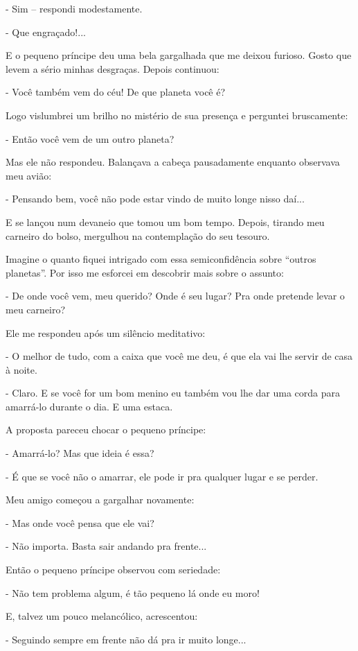 \begin{Parallel}[p]{}{}
{- Sim -- respondi modestamente.

- Que engraçado!...

E o pequeno príncipe deu uma bela gargalhada que me deixou furioso.
Gosto que levem a sério minhas desgraças. Depois continuou:

- Você também vem do céu! De que planeta você é?

Logo vislumbrei um brilho no mistério de sua presença e perguntei
bruscamente:

- Então você vem de um outro planeta?

Mas ele não respondeu. Balançava a cabeça pausadamente enquanto
observava meu avião:

- Pensando bem, você não pode estar vindo de muito longe nisso daí...

E se lançou num devaneio que tomou um bom tempo. Depois, tirando meu
carneiro do bolso, mergulhou na contemplação do seu tesouro.

Imagine o quanto fiquei intrigado com essa semiconfidência sobre
``outros planetas''. Por isso me esforcei em descobrir mais sobre o
assunto:

- De onde você vem, meu querido? Onde é seu lugar? Pra onde pretende
levar o meu carneiro?

Ele me respondeu após um silêncio meditativo:

- O melhor de tudo, com a caixa que você me deu, é que ela vai lhe
servir de casa à noite.

- Claro. E se você for um bom menino eu também vou lhe dar uma corda
para amarrá-lo durante o dia. E uma estaca.

A proposta pareceu chocar o pequeno príncipe:

- Amarrá-lo? Mas que ideia é essa?

- É que se você não o amarrar, ele pode ir pra qualquer lugar e se
perder.

Meu amigo começou a gargalhar novamente:

- Mas onde você pensa que ele vai?

- Não importa. Basta sair andando pra frente...

Então o pequeno príncipe observou com seriedade:

- Não tem problema algum, é tão pequeno lá onde eu moro!

E, talvez um pouco melancólico, acrescentou:

- Seguindo sempre em frente não dá pra ir muito longe...\\

}
\end{Parallel}
